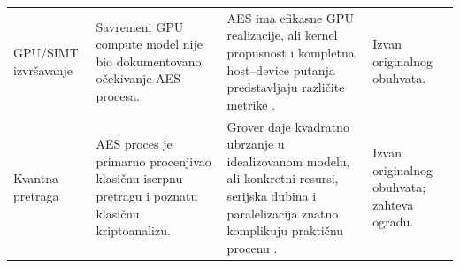 \begin{table}[htbp]
\begin{tabular}{@{}>{\raggedright\arraybackslash}p{} >{\raggedright\arraybackslash}p{} >{\raggedright\arraybackslash}p{} >{\raggedright\arraybackslash}p{}@{}}
\addlinespace
GPU/SIMT izvršavanje &
Savremeni GPU compute model nije bio dokumentovano očekivanje AES procesa. &
AES ima efikasne GPU realizacije, ali kernel propusnost i kompletna
host--device putanja predstavljaju različite metrike
\cite{tezcan2021gpu}. &
Izvan originalnog obuhvata. \\

\addlinespace
Kvantna pretraga &
AES proces je primarno procenjivao klasičnu iscrpnu pretragu i poznatu
klasičnu kriptoanalizu. &
Grover daje kvadratno ubrzanje u idealizovanom modelu, ali konkretni
resursi, serijska dubina i paralelizacija znatno komplikuju praktičnu
procenu \cite{grassl2016grover,jaques2020grover,nist_pqc_faq}. &
Izvan originalnog obuhvata; zahteva ogradu. \\
\bottomrule
\end{tabular}
\end{table}

\FloatBarrier
